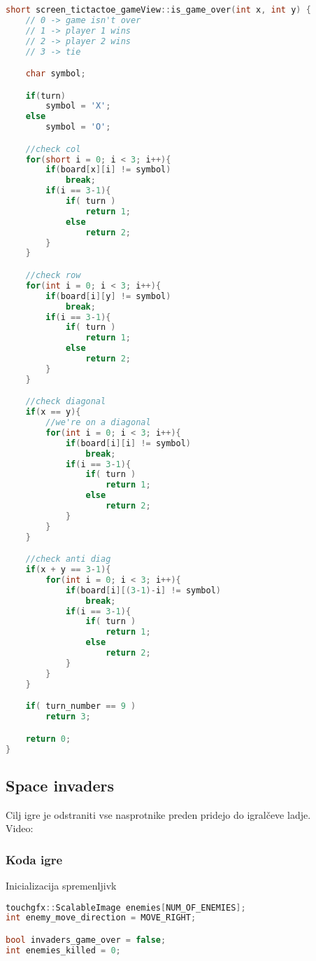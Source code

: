 \documentclass{article}
\begin{document}
\begin{lstlisting}[language=c++]
short screen_tictactoe_gameView::is_game_over(int x, int y) {
	// 0 -> game isn't over
	// 1 -> player 1 wins
	// 2 -> player 2 wins
	// 3 -> tie

	char symbol;

	if(turn)
		symbol = 'X';
	else
		symbol = 'O';

    //check col
    for(short i = 0; i < 3; i++){
        if(board[x][i] != symbol)
            break;
        if(i == 3-1){
            if( turn )
            	return 1;
            else
            	return 2;
        }
    }

    //check row
    for(int i = 0; i < 3; i++){
        if(board[i][y] != symbol)
            break;
        if(i == 3-1){
            if( turn )
            	return 1;
            else
            	return 2;
        }
    }

    //check diagonal
    if(x == y){
        //we're on a diagonal
        for(int i = 0; i < 3; i++){
            if(board[i][i] != symbol)
                break;
            if(i == 3-1){
                if( turn )
                	return 1;
                else
                	return 2;
            }
        }
    }

    //check anti diag
    if(x + y == 3-1){
        for(int i = 0; i < 3; i++){
            if(board[i][(3-1)-i] != symbol)
                break;
            if(i == 3-1){
                if( turn )
                	return 1;
                else
                	return 2;
            }
        }
    }

	if( turn_number == 9 )
		return 3;

	return 0;
}
\end{lstlisting}

\subsection{Space invaders}
\noindent
Cilj igre je odstraniti vse nasprotnike preden pridejo do
igral\v{c}eve ladje. \\
Video:

\subsubsection{Koda igre}
\noindent
Inicializacija spremenljivk
\begin{lstlisting}[language=c++]
touchgfx::ScalableImage enemies[NUM_OF_ENEMIES];
int enemy_move_direction = MOVE_RIGHT;

bool invaders_game_over = false;
int enemies_killed = 0;
\end{lstlisting}
\end{document}
